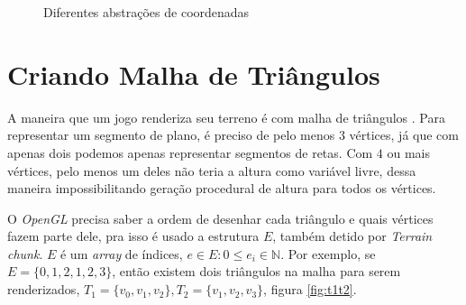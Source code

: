 \begin{figure}[H]
     \centering
     \hspace{0.1cm}
     \caption{Diferentes abstrações de coordenadas}
     \label{fig:coordenadasuahsuahs}
\end{figure}

\section{Criando Malha de Triângulos}
A maneira que um jogo renderiza seu terreno é com malha de triângulos \cite{dachsbacher2006interactive}.%
Para representar um segmento de plano, é preciso de pelo menos $3$ vértices, 
já que com apenas dois podemos apenas representar segmentos de retas. Com $4$ ou mais vértices,
pelo menos um deles não teria a altura como variável livre, dessa maneira impossibilitando geração procedural de altura para todos os vértices.

O \textit{OpenGL} precisa saber a ordem de desenhar cada triângulo e quais vértices fazem parte dele, 
pra isso é usado a estrutura $E$, também detido por \textit{Terrain chunk}. 
$E$ é um \textit{array} de índices, $e \in E: 0 \leq e_{i} \in \mathbb{N}$. Por exemplo, se $E = \{ 0, 1, 2, 1, 2, 3\}$,
então existem dois triângulos na malha para serem renderizados, $T_{1} = \{ v_{0}, v_{1}, v_{2}\}, T_{2} = \{ v_{1}, v_{2}, v_{3}\}$, figura \ref{fig:t1t2}.

